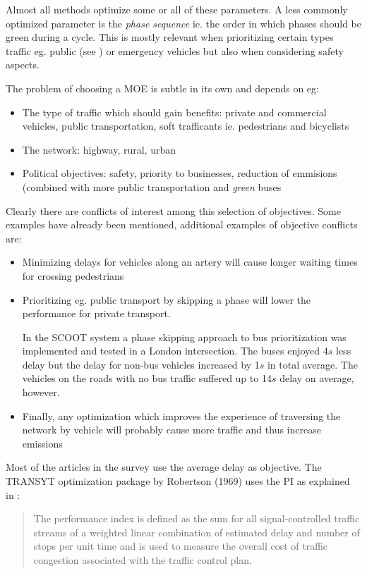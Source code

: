 Almost all methods optimize some or all of these parameters. A less commonly optimized parameter is the \textit{phase sequence} ie. the order in which phases should be green during a cycle. This is mostly relevant when prioritizing certain types traffic eg. public (see \cite{scoot2004}) or emergency vehicles but also when considering safety aspects.

The problem of choosing a MOE is subtle in its own and depends on eg:

\begin{itemize}
\item The type of traffic which should gain benefits: private and commercial vehicles, public transportation, soft trafficants ie. pedestrians and bicyclists
\item The network: highway, rural, urban
\item Political objectives: safety, priority to businesses, reduction of emmisions (combined with more public transportation and \textit{green} buses
\end{itemize}

Clearly there are conflicts of interest among this selection of objectives. Some examples have already been mentioned, additional examples of objective conflicts are:

\begin{itemize}
\item Minimizing delays for vehicles along an artery will cause longer waiting times for crossing pedestrians
\item Prioritizing eg. public transport by skipping a phase will lower the performance for private transport. 

In the SCOOT system \cite{scoot2004} a phase skipping approach to bus prioritization was implemented and tested in a London intersection. The buses enjoyed 4$s$ less delay but the delay for non-bus vehicles increased by 1$s$ in total average. The vehicles on the roads with no bus traffic suffered up to 14$s$ delay on average, however.
\item Finally, any optimization which improves the experience of traversing the network by vehicle will probably cause more traffic and thus increase emissions
\end{itemize}

Most of the articles in the survey use the average delay as objective. The TRANSYT optimization package by Robertson (1969) uses the PI as explained in \cite{26}:

\begin{quote}
The performance index
is defined as the sum for all signal-controlled traffic streams of a
weighted linear combination of estimated delay and number
of stops per unit time and is used to measure the overall cost of
traffic congestion associated with the traffic control plan.
\end{quote}

